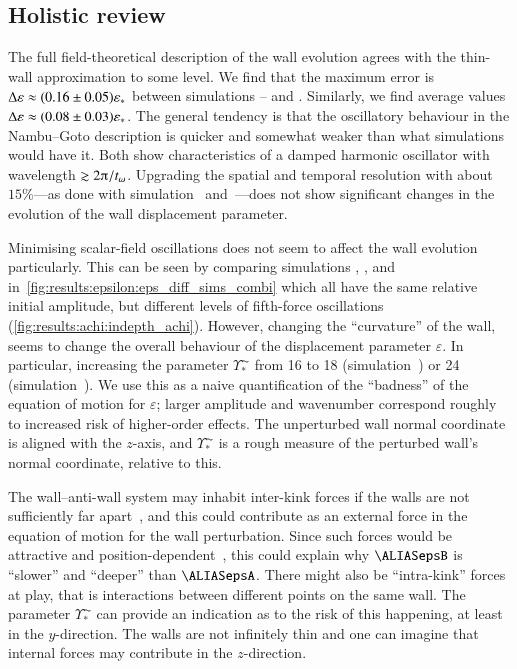     \subsection{Holistic review}%
        The full field-theoretical description of the wall evolution agrees with the thin-wall approximation to some level. We find that the maximum error is $ \Delta \varepsilon \approx (0.16 \pm 0.05)\varepsilon_\ast$ between simulations -- and . Similarly, we find average values $\Delta \varepsilon \approx (0.08 \pm 0.03)\varepsilon_\ast$. The general tendency is that the oscillatory behaviour in the Nambu--Goto description is quicker and somewhat weaker than what simulations would have it. Both show characteristics of a damped harmonic oscillator with wavelength $\gtrsim 2\ppi / t_\omega$. Upgrading the spatial and temporal resolution with about $15\%$---as done with simulation~ and~---does not show significant changes in the evolution of the wall displacement parameter.
        
        Minimising scalar-field oscillations does not seem to affect the wall evolution particularly. This can be seen by comparing simulations , ,  and  in~\cref{fig:results:epsilon:eps_diff_sims_combi} which all have the same relative initial amplitude, but different levels of fifth-force oscillations (\cref{fig:results:achi:indepth_achi}). However, changing the ``curvature'' of the wall, seems to change the overall behaviour of the displacement parameter $\varepsilon$. In particular, increasing the parameter $\Upsilon^{\AC}_\ast$ from 16 to 18 (simulation~) or 24 (simulation~). We use this as a naive quantification of the ``badness'' of the equation of motion for $\varepsilon$; larger amplitude and wavenumber correspond roughly to increased risk of higher-order effects. The unperturbed wall normal coordinate is aligned with the $z$-axis, and $\Upsilon^{\AC}_\ast$ is a rough measure of the perturbed wall's normal coordinate, relative to this. 

        The wall--anti-wall system may inhabit inter-kink forces if the walls are not sufficiently far apart~\citep{vachaspatiKinksDomainWalls2006}, and this could contribute as an external force in the equation of motion for the wall perturbation. Since such forces would be attractive and position-dependent~\citep{vachaspatiKinksDomainWalls2006}, this could explain why $\epsB$ is ``slower'' and ``deeper'' than $\epsA$. %
        There might also be ``intra-kink'' forces at play, that is interactions between different points on the same wall. The parameter $\Upsilon^{\AC}_\ast$ can provide an indication as to the risk of this happening, at least in the $y$-direction. The walls are not infinitely thin and one can imagine that internal forces may contribute in the $z$-direction.


